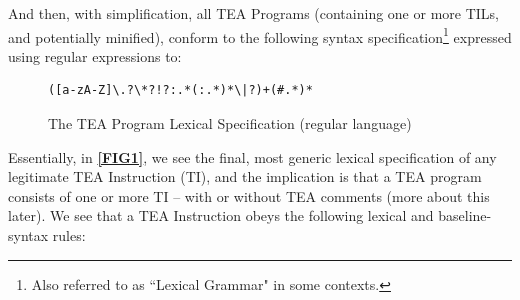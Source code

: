 \documentclass[a4paper, 18pt]{book} %
\begin{document}
And then, with simplification, all TEA Programs (containing one or more TILs, and potentially minified), conform to the following syntax specification\footnote{Also referred to as ``Lexical Grammar" in some contexts.} expressed using regular expressions to:


    
    \begin{figure}[H]
  \centering
  \begin{tcolorbox}[myterminalstyle, title=TEA Program (Regular Expression)]
  \begin{lstlisting}
([a-zA-Z]\.?\*?!?:.*(:.*)*\|?)+(#.*)*
  \end{lstlisting}
  \end{tcolorbox}
  \caption{The TEA Program Lexical Specification (regular language)}
  \label{FIG2}
\end{figure}


Essentially, in \textbf{\autoref{FIG1}}, we see the final, most generic lexical specification of any legitimate TEA Instruction (TI), and the implication is that a TEA program consists of one or more TI – with or without TEA comments (more about this later). We see that a TEA Instruction obeys the following lexical and baseline-syntax rules:
\end{document}
